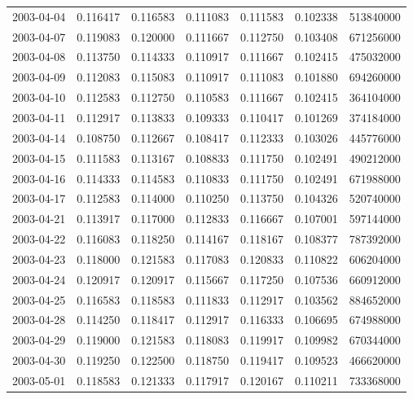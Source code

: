 \begin{tabular}{lrrrrrr}
2003-04-04 &    0.116417 &    0.116583 &    0.111083 &    0.111583 &    0.102338 &   513840000 \\
2003-04-07 &    0.119083 &    0.120000 &    0.111667 &    0.112750 &    0.103408 &   671256000 \\
2003-04-08 &    0.113750 &    0.114333 &    0.110917 &    0.111667 &    0.102415 &   475032000 \\
2003-04-09 &    0.112083 &    0.115083 &    0.110917 &    0.111083 &    0.101880 &   694260000 \\
2003-04-10 &    0.112583 &    0.112750 &    0.110583 &    0.111667 &    0.102415 &   364104000 \\
2003-04-11 &    0.112917 &    0.113833 &    0.109333 &    0.110417 &    0.101269 &   374184000 \\
2003-04-14 &    0.108750 &    0.112667 &    0.108417 &    0.112333 &    0.103026 &   445776000 \\
2003-04-15 &    0.111583 &    0.113167 &    0.108833 &    0.111750 &    0.102491 &   490212000 \\
2003-04-16 &    0.114333 &    0.114583 &    0.110833 &    0.111750 &    0.102491 &   671988000 \\
2003-04-17 &    0.112583 &    0.114000 &    0.110250 &    0.113750 &    0.104326 &   520740000 \\
2003-04-21 &    0.113917 &    0.117000 &    0.112833 &    0.116667 &    0.107001 &   597144000 \\
2003-04-22 &    0.116083 &    0.118250 &    0.114167 &    0.118167 &    0.108377 &   787392000 \\
2003-04-23 &    0.118000 &    0.121583 &    0.117083 &    0.120833 &    0.110822 &   606204000 \\
2003-04-24 &    0.120917 &    0.120917 &    0.115667 &    0.117250 &    0.107536 &   660912000 \\
2003-04-25 &    0.116583 &    0.118583 &    0.111833 &    0.112917 &    0.103562 &   884652000 \\
2003-04-28 &    0.114250 &    0.118417 &    0.112917 &    0.116333 &    0.106695 &   674988000 \\
2003-04-29 &    0.119000 &    0.121583 &    0.118083 &    0.119917 &    0.109982 &   670344000 \\
2003-04-30 &    0.119250 &    0.122500 &    0.118750 &    0.119417 &    0.109523 &   466620000 \\
2003-05-01 &    0.118583 &    0.121333 &    0.117917 &    0.120167 &    0.110211 &   733368000 \\

\end{tabular}
